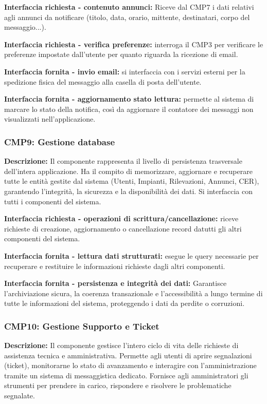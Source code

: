 \textbf{Interfaccia richiesta - contenuto annunci:}
Riceve dal CMP7 i dati relativi agli annunci da
notificare (titolo, data, orario, mittente, destinatari, corpo del messaggio...).

\textbf{Interfaccia richiesta - verifica preferenze:}
interroga il CMP3 per verificare le preferenze impostate dall'utente per quanto riguarda
la ricezione di email.

\textbf{Interfaccia fornita - invio email:}
si interfaccia con i servizi esterni per la spedizione fisica del messaggio alla casella di posta dell'utente.

\textbf{Interfaccia fornita - aggiornamento stato lettura:}
permette al sistema di marcare lo stato della notifica, così da aggiornare il contatore
dei messaggi non visualizzati nell'applicazione.

\subsubsection*{CMP9: Gestione database}
\textbf{Descrizione: }Il componente rappresenta il livello di persistenza trasversale
dell'intera applicazione. Ha il compito di memorizzare, aggiornare e recuperare tutte le
entità gestite dal sistema (Utenti, Impianti, Rilevazioni, Annunci, CER), garantendo l'integrità,
la sicurezza e la disponibilità dei dati. Si interfaccia con tutti i componenti del sistema.

\textbf{Interfaccia richiesta - operazioni di scrittura/cancellazione:}
riceve richieste di creazione, aggiornamento o cancellazione record datutti gli altri componenti
del sistema.

\textbf{Interfaccia fornita - lettura dati strutturati:}
esegue le query necessarie per recuperare e restituire le informazioni richieste dagli altri
componenti.

\textbf{Interfaccia fornita - persistenza e integrità dei dati:}
Garantisce l'archiviazione sicura, la coerenza transazionale e l'accessibilità a lungo
termine di tutte le informazioni del sistema, proteggendo i dati da perdite o corruzioni.

\subsubsection*{CMP10: Gestione Supporto e Ticket}
\textbf{Descrizione:} Il componente gestisce l'intero ciclo di vita delle richieste di assistenza tecnica
e amministrativa. Permette agli utenti di aprire segnalazioni (ticket), monitorarne lo stato
di avanzamento e interagire con l'amministrazione tramite un sistema di messaggistica dedicato.
Fornisce agli amministratori gli strumenti per prendere in carico, rispondere e risolvere le
problematiche segnalate.

